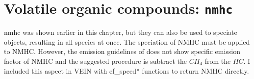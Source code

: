 \documentclass[12pt,graybox,envcountchap,sectrefs]{krantz}
\makeatletter
\newenvironment{Shaded}{\begin{snugshade}}{\end{snugshade}}
\newcommand{\KeywordTok}[1]{\textcolor[rgb]{0.13,0.29,0.53}{\textbf{#1}}}
\newcommand{\DataTypeTok}[1]{\textcolor[rgb]{0.13,0.29,0.53}{#1}}
\newcommand{\DecValTok}[1]{\textcolor[rgb]{0.00,0.00,0.81}{#1}}
\newcommand{\StringTok}[1]{\textcolor[rgb]{0.31,0.60,0.02}{#1}}
\newcommand{\CommentTok}[1]{\textcolor[rgb]{0.56,0.35,0.01}{\textit{#1}}}
\newcommand{\OtherTok}[1]{\textcolor[rgb]{0.56,0.35,0.01}{#1}}
\newcommand{\ControlFlowTok}[1]{\textcolor[rgb]{0.13,0.29,0.53}{\textbf{#1}}}
\newcommand{\OperatorTok}[1]{\textcolor[rgb]{0.81,0.36,0.00}{\textbf{#1}}}
\newcommand{\NormalTok}[1]{#1}
\newenvironment{kframe}{%
\medskip{}
\setlength{\fboxsep}{.8em}
 \def\at@end@of@kframe{}%
 \ifinner\ifhmode%
  \def\at@end@of@kframe{\end{minipage}}%
  \begin{minipage}{\columnwidth}%
 \fi\fi%
 \def\FrameCommand##1{\hskip\@totalleftmargin \hskip-\fboxsep
 \colorbox{shadecolor}{##1}\hskip-\fboxsep
     \hskip-\linewidth \hskip-\@totalleftmargin \hskip\columnwidth}%
 \MakeFramed {\advance\hsize-\width
   \@totalleftmargin\z@ \linewidth\hsize
   \@setminipage}}%
 {\par\unskip\endMakeFramed%
 \at@end@of@kframe}
\renewenvironment{Shaded}{\begin{kframe}}{\end{kframe}}
\theoremstyle{definition}
\theoremstyle{definition}
\theoremstyle{definition}
\theoremstyle{remark}
\makeatother
\begin{document}
\section{\texorpdfstring{Volatile organic compounds:
\texttt{nmhc}}{Volatile organic compounds: nmhc}}\label{volatile-organic-compounds-nmhc}

nmhc was shown earlier in this chapter, but they can also be used to
speciate objects, resulting in all species at once. The speciation of
NMHC must be applied to NMHC. However, the emission guidelines of
\citet{NtziachristosSamaras2016} does not show specific emission factor
of NMHC and the suggested procedure is subtract the \(CH_4\) from the
\(HC\). I included this aspect in VEIN with ef\_speed* functions to
return NMHC directly.

\begin{Shaded}
\end{Shaded}
\end{document}
